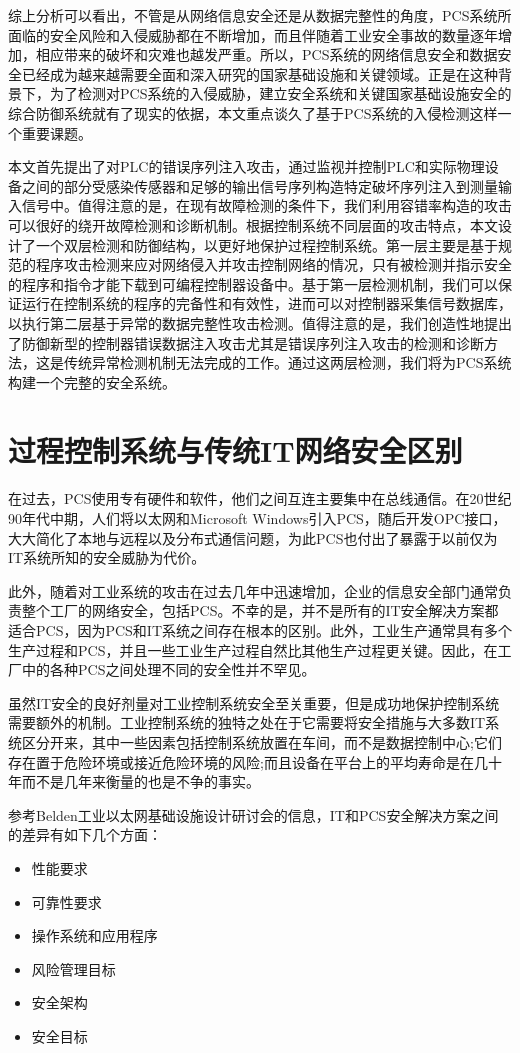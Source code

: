 综上分析可以看出，不管是从网络信息安全还是从数据完整性的角度，PCS系统所面临的安全风险和入侵威胁都在不断增加，而且伴随着工业安全事故的数量逐年增加，相应带来的破坏和灾难也越发严重。所以，PCS系统的网络信息安全和数据安全已经成为越来越需要全面和深入研究的国家基础设施和关键领域。正是在这种背景下，为了检测对PCS系统的入侵威胁，建立安全系统和关键国家基础设施安全的综合防御系统就有了现实的依据，本文重点谈久了基于PCS系统的入侵检测这样一个重要课题。

本文首先提出了对PLC的错误序列注入攻击，通过监视并控制PLC和实际物理设备之间的部分受感染传感器和足够的输出信号序列构造特定破坏序列注入到测量输入信号中。值得注意的是，在现有故障检测的条件下，我们利用容错率构造的攻击可以很好的绕开故障检测和诊断机制。根据控制系统不同层面的攻击特点，本文设计了一个双层检测和防御结构，以更好地保护过程控制系统。第一层主要是基于规范的程序攻击检测来应对网络侵入并攻击控制网络的情况，只有被检测并指示安全的程序和指令才能下载到可编程控制器设备中。基于第一层检测机制，我们可以保证运行在控制系统的程序的完备性和有效性，进而可以对控制器采集信号数据库，以执行第二层基于异常的数据完整性攻击检测。值得注意的是，我们创造性地提出了防御新型的控制器错误数据注入攻击尤其是错误序列注入攻击的检测和诊断方法，这是传统异常检测机制无法完成的工作。通过这两层检测，我们将为PCS系统构建一个完整的安全系统。

\section{过程控制系统与传统IT网络安全区别}


在过去，PCS使用专有硬件和软件，他们之间互连主要集中在总线通信。在20世纪90年代中期，人们将以太网和Microsoft Windows引入PCS，随后开发OPC接口，大大简化了本地与远程以及分布式通信问题，为此PCS也付出了暴露于以前仅为IT系统所知的安全威胁为代价。

此外，随着对工业系统的攻击在过去几年中迅速增加，企业的信息安全部门通常负责整个工厂的网络安全，包括PCS。不幸的是，并不是所有的IT安全解决方案都适合PCS，因为PCS和IT系统之间存在根本的区别。此外，工业生产通常具有多个生产过程和PCS，并且一些工业生产过程自然比其他生产过程更关键。因此，在工厂中的各种PCS之间处理不同的安全性并不罕见。

虽然IT安全的良好剂量对工业控制系统安全至关重要，但是成功地保护控制系统需要额外的机制。工业控制系统的独特之处在于它需要将安全措施与大多数IT系统区分开来，其中一些因素包括控制系统放置在车间，而不是数据控制中心;它们存在置于危险环境或接近危险环境的风险;而且设备在平台上的平均寿命是在几十年而不是几年来衡量的也是不争的事实。

参考Belden工业以太网基础设施设计研讨会的信息，IT和PCS安全解决方案之间的差异有如下几个方面：
\begin{itemize}
	\item 性能要求
	\item 可靠性要求
	\item 操作系统和应用程序
	\item 风险管理目标
	\item 安全架构
	\item 安全目标
\end{itemize}


